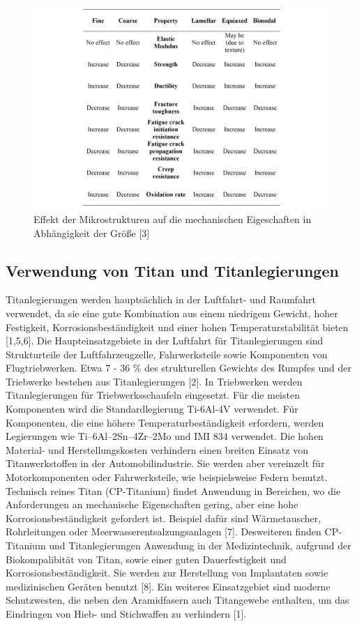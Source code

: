 \begin{figure}[h]
	\centering
	\includegraphics[width=0.9\linewidth]{"Bilder/Tabelle 3"}
	\caption[Tabelle]{Effekt der Mikrostrukturen auf die mechanischen Eigeschaften in Abhängigkeit der Größe [3]}
	\label{fig:tabelle-3}
\end{figure}

\pagebreak

\subsection{Verwendung von Titan und Titanlegierungen}
Titanlegierungen werden hauptsächlich in der Luftfahrt- und Raumfahrt verwendet, da sie eine gute Kombination aus einem niedrigem Gewicht, hoher Festigkeit, Korrosionsbeständigkeit und einer hohen Temperaturstabilität bieten [1,5,6]. Die Haupteinsatzgebiete in der Luftfahrt für Titanlegierungen sind Strukturteile der Luftfahrzeugzelle, Fahrwerksteile sowie Komponenten von Flugtriebwerken. Etwa 7 - 36 \% des strukturellen Gewichts des Rumpfes und der Triebwerke bestehen aus Titanlegierungen [2]. In Triebwerken werden Titanlegierungen für Triebwerksschaufeln eingesetzt. Für die meisten Komponenten wird die Standardlegierung Ti-6Al-4V verwendet. Für Komponenten, die eine höhere Temperaturbeständigkeit erfordern, werden Legierungen wie Ti–6Al–2Sn–4Zr–2Mo und IMI 834 verwendet. Die hohen Material- und Herstellungskosten verhindern einen breiten Einsatz von Titanwerkstoffen in der Automobilindustrie. Sie werden aber vereinzelt für Motorkomponenten oder Fahrwerksteile, wie beispielsweise Federn benutzt. Technisch reines Titan (CP-Titanium) findet Anwendung in Bereichen, wo die Anforderungen an mechanische Eigenschaften gering, aber eine hohe Korrosionsbeständigkeit gefordert ist. Beispiel dafür sind Wärmetauscher, Rohrleitungen oder Meerwasserentsalzungsanlagen [7]. Desweiteren finden CP-Titanium und Titanlegierungen Anwendung in der Medizintechnik, aufgrund der Biokompalibität von Titan, sowie einer guten Dauerfestigkeit und Korrosionsbeständigkeit. Sie werden zur Herstellung von Implantaten sowie medizinischen Geräten benutzt [8]. Ein weiteres Einsatzgebiet sind moderne Schutzwesten, die neben den Aramidfasern auch Titangewebe enthalten, um das Eindringen von Hieb- und Stichwaffen zu verhindern [1]. 


